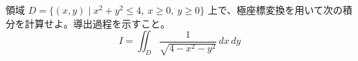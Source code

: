 
領域 $D = \{(x,y) \mid x^{2} + y^{2} \le 4,\ x \ge 0,\ y \ge 0\}$ 上で、極座標変換を用いて次の積分を計算せよ。導出過程を示すこと。
\[
I = \iint_{D} \frac{1}{\sqrt{4 - x^{2} - y^{2}}}\, dx\, dy
\]

